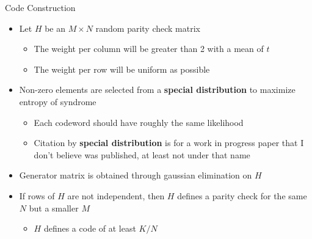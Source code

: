 \documentclass[10pt,ignorenonframetext,]{beamer}
\providecommand{\tightlist}{%
  \setlength{\itemsep}{0pt}\setlength{\parskip}{0pt}}
\begin{document}
\begin{frame}{Code Construction}
\protect\hypertarget{code-construction}{}
\begin{itemize}[<+->]
\tightlist
\item
  Let \(H\) be an \(M\times N\) random parity check matrix

  \begin{itemize}[<+->]
  \tightlist
  \item
    The weight per column will be greater than 2 with a mean of \(t\)
  \item
    The weight per row will be uniform as possible
  \end{itemize}
\item
  Non-zero elements are selected from a \textbf{special distribution} to
  maximize entropy of syndrome

  \begin{itemize}[<+->]
  \tightlist
  \item
    Each codeword should have roughly the same likelihood
  \item
    Citation by \textbf{special distribution} is for a work in progress
    paper that I don't believe was published, at least not under that
    name
  \end{itemize}
\item
  Generator matrix is obtained through gaussian elimination on \(H\)
\item
  If rows of \(H\) are not independent, then \(H\) defines a parity
  check for the same \(N\) but a smaller \(M\)

  \begin{itemize}[<+->]
  \tightlist
  \item
    \(H\) defines a code of at least \(K/N\)
  \end{itemize}
\end{itemize}
\end{frame}
\end{document}

